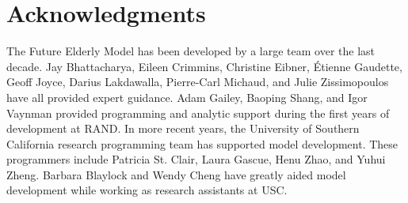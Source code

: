 \section{Acknowledgments}

The Future Elderly Model has been developed by a large team over the last decade.  Jay Bhattacharya, Eileen Crimmins, Christine Eibner, \'Etienne Gaudette, Geoff Joyce, Darius Lakdawalla,
Pierre-Carl Michaud, and Julie Zissimopoulos have all provided expert guidance.  Adam Gailey, Baoping Shang, and Igor Vaynman provided programming and analytic 
support during the first years of development at RAND.  In more recent years, the University of Southern California research programming team has supported 
model development.  These programmers include Patricia St. Clair, Laura Gascue, Henu Zhao, and Yuhui Zheng. Barbara Blaylock and Wendy Cheng have greatly aided 
model development while working as research assistants at USC.

